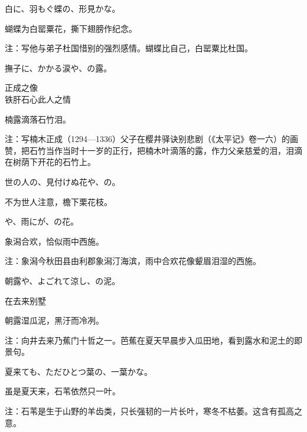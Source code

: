 \begin{haiku}
    {\FH 白に、羽もぐ蝶の、形見かな。}

    {\FK 蝴蝶为白罂粟花，撕下翅膀作纪念。}

    {\FT 注：写他与弟子杜国惜别的强烈感情。蝴蝶比自己，白罂粟比杜国。}
\end{haiku}

\begin{haiku}
    {\FH 撫子に、かかる涙や、の露。}

    {\FK 正成之像\\铁肝石心此人之情}

    {\FK 楠露滴落石竹泪。}

    {\FT 注：写楠木正成（1294—1336）父子在樱井驿诀别悲剧（《太平记》卷一六）的画赞，把石竹当作当时十一岁的正行，把楠木叶滴落的露，作力父亲慈爱的泪，泪滴在树荫下开花的石竹上。}
\end{haiku}

\begin{haiku}
    {\FH 世の人の、見付けぬ花や、の。}

    {\FK 不为世人注意，檐下栗花枝。}
\end{haiku}

\begin{haiku}
    {\FH {}や、雨にが、の花。}

    {\FK 象潟合欢，恰似雨中西施。}

    {\FT 注：象潟今秋田县由利郡象潟汀海滨，雨中合欢花像颦眉泪湿的西施。}
\end{haiku}

\begin{haiku}
    {\FH 朝露や、よごれて涼し、の泥。}

    {\FK 在去来别墅}

    {\FK 朝露湿瓜泥，黑汙而冷冽。}

    {\FT 注：向井去来乃蕉门十哲之一。芭蕉在夏天早晨步入瓜田地，看到露水和泥土的即景句。}
\end{haiku}

\begin{haiku}
    {\FH 夏来ても、ただひとつ葉の、一葉かな。}

    {\FK 虽是夏天来，石苇依然只一叶。}

    {\FT 注：石苇是生于山野的羊齿类，只长强韧的一片长叶，寒冬不枯萎。这含有孤高之意。}
\end{haiku}

